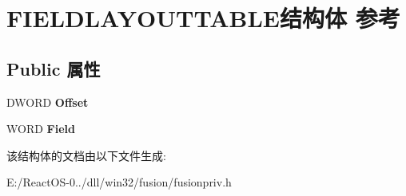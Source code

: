 \hypertarget{struct_f_i_e_l_d_l_a_y_o_u_t_t_a_b_l_e}{}\section{F\+I\+E\+L\+D\+L\+A\+Y\+O\+U\+T\+T\+A\+B\+L\+E结构体 参考}
\label{struct_f_i_e_l_d_l_a_y_o_u_t_t_a_b_l_e}
\subsection*{Public 属性}
\begin{DoxyCompactItemize}
\item 
\mbox{\label{struct_f_i_e_l_d_l_a_y_o_u_t_t_a_b_l_e_a299e17a89949eb60edf736e5988b9dea}} 
D\+W\+O\+RD {\bfseries Offset}
\item 
\mbox{\label{struct_f_i_e_l_d_l_a_y_o_u_t_t_a_b_l_e_a32ff0aa82e984b8a9c4e400c9f6f4a96}} 
W\+O\+RD {\bfseries Field}
\end{DoxyCompactItemize}


该结构体的文档由以下文件生成\+:\begin{DoxyCompactItemize}
\item 
E\+:/\+React\+O\+S-\/0../dll/win32/fusion/fusionpriv.\+h\end{DoxyCompactItemize}
